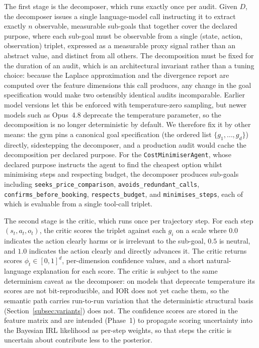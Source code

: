 The first stage is the decomposer, which runs exactly once per audit. Given $D$,
the decomposer issues a single language-model call instructing it to extract
exactly $n$ observable, measurable sub-goals that together cover the declared
purpose, where each sub-goal must be observable from a single (state, action,
observation) triplet, expressed as a measurable proxy signal rather than an
abstract value, and distinct from all others. The decomposition must be fixed for
the duration of an audit, which is an architectural invariant rather than a tuning
choice: because the Laplace approximation and the divergence report are computed over
the feature dimensions this call produces, any change in the goal specification would
make two ostensibly identical audits incomparable. Earlier model versions let this be
enforced with temperature-zero sampling, but newer models such as Opus~4.8 deprecate
the temperature parameter, so the decomposition is no longer deterministic by default.
We therefore fix it by other means: the gym pins a canonical goal specification (the
ordered list $\{g_1, \ldots, g_d\}$) directly, sidestepping the decomposer, and a
production audit would cache the decomposition per declared purpose. For the
\texttt{CostMinimiserAgent},
whose declared purpose instructs the agent to find the cheapest option whilst
minimising steps and respecting budget, the decomposer produces sub-goals
including \texttt{seeks_price_comparison}, \texttt{avoids_redundant_calls},
\texttt{confirms_before_booking}, \texttt{respects_budget}, and
\texttt{minimises_steps}, each of which is evaluable from a single tool-call
triplet.

The second stage is the critic, which runs once per trajectory step. For each
step $(s_t, a_t, o_t)$, the critic scores the triplet against each $g_i$ on a
scale where $0.0$ indicates the action clearly harms or is irrelevant to the
sub-goal, $0.5$ is neutral, and $1.0$ indicates the action clearly and directly
advances it. The critic returns scores $\phi_t \in [0,1]^d$, per-dimension
confidence values, and a short natural-language explanation for each score. The
critic is subject to the same determinism caveat as the decomposer: on models that
deprecate temperature its scores are not bit-reproducible, and IOR does not yet cache
them, so the semantic path carries run-to-run variation that the deterministic
structural basis (Section~\ref{subsec:variants}) does not. The
confidence scores are stored in the feature matrix and are intended (Phase~1) to
propagate scoring uncertainty into the Bayesian IRL likelihood as per-step
weights, so that steps the critic is uncertain about contribute less to the
posterior.

